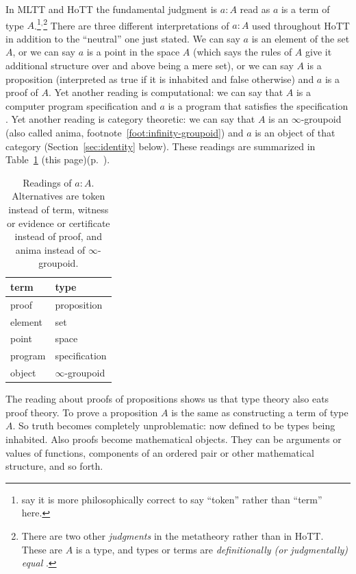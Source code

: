 \documentclass[11pt]{article}
\begin{document}
In MLTT and HoTT the fundamental judgment is $a : A$ read as $a$ is
a term of type $A$.\footnote{\citet{ladyman-presnell-foundations} say
it is more philosophically correct to say ``token'' rather than ``term''
here.}$^,$\footnote{There are two other \emph{judgments} in the
metatheory rather than in HoTT.  These are $A$ is a type, and types or
terms are \emph{definitionally (or judgmentally) equal}
.}
There are three different interpretations of $a : A$ used throughout HoTT
in addition to the ``neutral'' one just stated.
We can say $a$ is an element of the set $A$, or we can say $a$ is a point
in the space $A$ (which says the rules of $A$ give it additional structure
over and above being a mere set),
or we can say $A$ is a proposition (interpreted
as true if it is inhabited and false otherwise) and $a$ is a proof of $A$.
Yet another reading is computational: we can say that $A$ is a computer program
specification and $a$ is a program that satisfies the specification
\citep*[Chapter~2]{programming-martin-lof}.
Yet another reading is category theoretic: we can say that $A$ is an
$\infty$-groupoid (also called anima, footnote~\ref{foot:infinity-groupoid})
and $a$ is an object of that category (Section~\ref{sec:identity} below).
These readings are summarized in Table~\ref{tab:term-type}
{(this page)}{(p.~\pageref{tab:term-type})}.
\begin{table}
\caption{Readings of $a : A$.  Alternatives are token instead of term,
witness or evidence or certificate instead of proof, and anima instead
of $\infty$-groupoid.}
\begin{center}
\begin{tabular}{ll}
term & type \\
\hline
proof & proposition \\
element & set \\
point & space \\
program & specification \\
object & $\infty$-groupoid
\end{tabular}
\end{center}
\label{tab:term-type}
\end{table}
 
The reading about proofs of propositions shows us that type theory
also eats proof theory.  To prove a
proposition $A$ is the same as constructing a term of type $A$.  So truth
becomes completely unproblematic: now defined to be types
being inhabited.
Also proofs become mathematical objects.  They can be arguments or values
of functions, components of an ordered pair or other mathematical structure,
and so forth.
\end{document}
